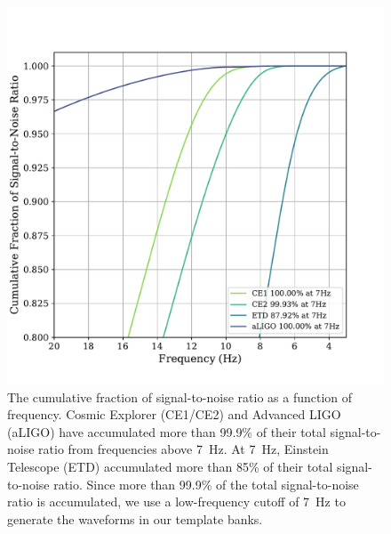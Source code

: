\begin{figure}
    \includegraphics[width=1.1\columnwidth]{Figures/3G-bns-search-prospects/cumul-SNR-compcost.pdf}
    \caption{The cumulative fraction of signal-to-noise ratio as a function of frequency. Cosmic Explorer (CE1/CE2) and Advanced LIGO (aLIGO) have accumulated more than 99.9\% of their total signal-to-noise ratio from frequencies above 7~Hz. At 7~Hz, Einstein Telescope (ETD) accumulated more than 85\% of their total signal-to-noise ratio. Since more than 99.9\% of the total signal-to-noise ratio is accumulated, we use a low-frequency cutoff of 7~Hz to generate the waveforms in our template banks.}
\label{Fig:comp-cost-cumulSNR}
\end{figure}

